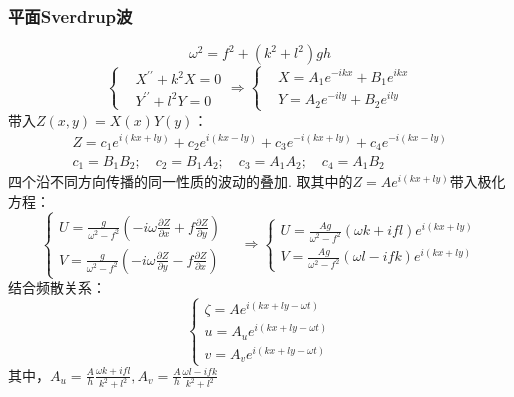 \documentclass[a4paper,12pt]{article}
\begin{document}
    \subsubsection{平面Sverdrup波}
    \[
        \omega^2=f^2+(k^2+l^2)gh
    \]
    \[
        \left\{
            \begin{aligned}
                &X^{\prime \prime}+k^{2} X=0\\
                &Y^{\prime \prime}+l^{2} Y=0
            \end{aligned}
        \right.
        \Rightarrow\left\{\begin{aligned}
            &X=A_{1} e^{-i k x}+B_{1} e^{i k x} \\
            &Y=A_{2} e^{-i l y}+B_{2} e^{i l y}
            \end{aligned}\right.
    \]
    带入$Z(x,y)=X(x)Y(y)$：
    \[
        \begin{array}{l}
            Z=c_{1} e^{i(k x+l y)}+c_{2} e^{i(k x-l y)}+c_{3} e^{-i(k x+l y)}+c_{4} e^{-i(k x-l y)} \\
            c_{1}=B_{1} B_{2} ; \quad c_{2}=B_{1} A_{2} ; \quad c_{3}=A_{1} A_{2} ; \quad c_{4}=A_{1} B_{2}
            \end{array}
    \]
    四个沿不同方向传播的同一性质的波动的叠加.
    取其中的$Z=Ae^{i(kx+ly)}$带入极化方程：
    \[
        \left\{\begin{aligned}            U=\frac{g}{\omega^{2}-f^{2}}\left(-i \omega \frac{\partial Z}{\partial x}+f \frac{\partial Z}{\partial y}\right) \\
            V=\frac{g}{\omega^{2}-f^{2}}\left(-i \omega \frac{\partial Z}{\partial y}-f \frac{\partial Z}{\partial x}\right)
            \end{aligned} \quad \Rightarrow \left\{\begin{aligned}
            U=\frac{A g}{\omega^{2}-f^{2}}(\omega k+i f l) e^{i(k x+l y)} \\
            V=\frac{A g}{\omega^{2}-f^{2}}(\omega l-i f k) e^{i(k x+l y)}
            \end{aligned}\right.\right.
    \]
    结合频散关系：
    \[
        \left\{\begin{aligned}
            \zeta=A e^{i(k x+l y-\omega t)} \\
            u=A_{u} e^{i(k x+l y-\omega t)} \\
            v=A_{v} e^{i(k x+l y-\omega t)}
            \end{aligned}\right.
    \]
    其中，$\displaystyle  A_{u}=\frac{A}{h} \frac{\omega k+i f l}{k^{2}+l^{2}},  A_{v}=\frac{A}{h} \frac{\omega l-i f k}{k^{2}+l^{2}}$\\
\end{document}
